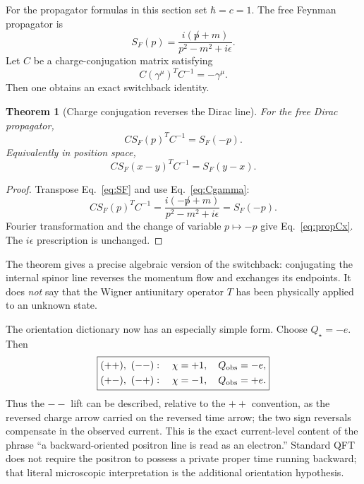 \documentclass[11pt]{article}
\newtheorem{theorem}{Theorem}[section]
\theoremstyle{definition}\newtheorem{definition}[theorem]{Definition}
\theoremstyle{remark}\newtheorem{remark}[theorem]{Remark}\newtheorem{conjecture}[theorem]{Conjecture}
\begin{document}
For the propagator formulas in this section set $\hbar=c=1$. The free Feynman propagator is
\begin{equation}\label{eq:SF}
 S_F(p)=\frac{i(\not p+m)}{p^2-m^2+i\epsilon}.
\end{equation}
Let $C$ be a charge-conjugation matrix satisfying
\begin{equation}\label{eq:Cgamma}
 C(\gamma^\mu)^T C^{-1}=-\gamma^\mu.
\end{equation}
Then one obtains an exact switchback identity.
\begin{theorem}[Charge conjugation reverses the Dirac line]\label{thm:propC}
For the free Dirac propagator,
\begin{equation}\label{eq:propC}
 \boxed{C S_F(p)^T C^{-1}=S_F(-p)}.
\end{equation}
Equivalently in position space,
\begin{equation}\label{eq:propCx}
 \boxed{C S_F(x-y)^T C^{-1}=S_F(y-x)}.
\end{equation}
\end{theorem}
\begin{proof}
Transpose Eq.~\eqref{eq:SF} and use Eq.~\eqref{eq:Cgamma}:
\begin{equation}
 C S_F(p)^T C^{-1}
 =\frac{i(-\not p+m)}{p^2-m^2+i\epsilon}=S_F(-p).
\end{equation}
Fourier transformation and the change of variable $p\mapsto-p$ give Eq.~\eqref{eq:propCx}. The $i\epsilon$ prescription is unchanged.
\end{proof}

The theorem gives a precise algebraic version of the switchback: conjugating the internal spinor line reverses the momentum flow and exchanges its endpoints. It does \emph{not} say that the Wigner antiunitary operator $T$ has been physically applied to an unknown state.

The orientation dictionary now has an especially simple form. Choose $Q_\star=-e$. Then
\begin{equation}\label{eq:electronliftclasses}
 \boxed{
 \begin{aligned}
 (++),\ (--)&:\quad \chi=+1,\quad Q_{\rm obs}=-e,\\
 (+-),\ (-+)&:\quad \chi=-1,\quad Q_{\rm obs}=+e.
 \end{aligned}}
\end{equation}
Thus the $--$ lift can be described, relative to the $++$ convention, as the reversed charge arrow carried on the reversed time arrow; the two sign reversals compensate in the observed current. This is the exact current-level content of the phrase ``a backward-oriented positron line is read as an electron.'' Standard QFT does not require the positron to possess a private proper time running backward; that literal microscopic interpretation is the additional orientation hypothesis.
\end{document}
